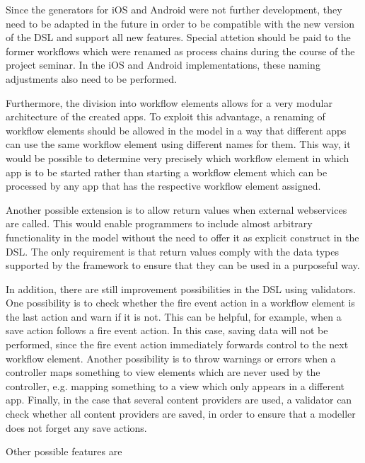 
Since the generators for iOS and Android were not further development, they need to be adapted in the future in order to be compatible with the new version of the DSL and support all new features. Special attetion should be paid to the former workflows which were renamed as process chains during the course of the project seminar. In the iOS and Android implementations, these naming adjustments also need to be performed.

Furthermore, the division into workflow elements allows for a very modular architecture of the created apps. To exploit this advantage, a renaming of workflow elements should be allowed in the model in a way that different apps can use the same workflow element using different names for them. This way, it would be possible to determine very precisely which workflow element in which app is to be started rather than starting a workflow element which can be processed by any app that has the respective workflow element assigned.

Another possible extension is to allow return values when external webservices are called. This would enable programmers to include almost arbitrary functionality in the model without the need to offer it as explicit construct in the DSL. The only requirement is that return values comply with the data types supported by the \MD framework to ensure that they can be used in a purposeful way.

In addition, there are still improvement possibilities in the DSL using validators. One possibility is to check whether the fire event action in a workflow element is the last action and warn if it is not. This can be helpful, for example, when a save action follows a fire event action. In this case, saving data will not be performed, since the fire event action immediately forwards control to the next workflow element. Another possibility is to throw warnings or errors when a controller maps something to view elements which are never used by the controller, e.g. mapping something to a view which only appears in a different app. Finally, in the case that several content providers are used, a validator can check whether all content providers are saved, in order to ensure that a modeller does not forget any save actions.

Other possible features are

